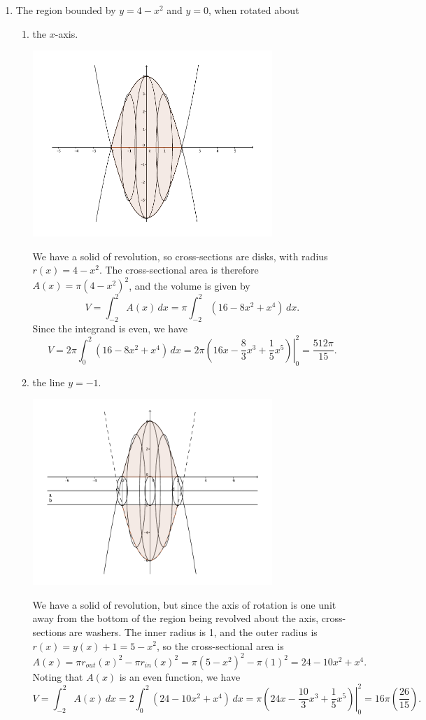 \documentclass[12pt]{article}
\begin{document}
\begin{enumerate}
\begin{enumerate}
 \item The region bounded by $y=4-x^2$ and $y=0$, when rotated about
\begin{enumerate}
 \item the $x$-axis.


 \includegraphics[width=0.75\textwidth]{WS4-2ci}


We have a solid of revolution, so cross-sections are disks, with radius $r(x)=4-x^2$. The cross-sectional area is therefore $A(x)=\pi(4-x^2)^2$, and the volume is given by
\[
 V = \int_{-2}^2A(x)\,dx = \pi\int_{-2}^2(16-8x^2+x^4)\,dx.
\]
Since the integrand is even, we have
\[
 V=2\pi\int_0^2(16-8x^2+x^4)\,dx = 2\pi\left.\left(16x-\frac{8}{3}x^3+\frac{1}{5}x^5\right)\right|_0^2 = \frac{512\pi}{15}.
\]
\newpage

 \item the line $y=-1$.


 \includegraphics[width=0.75\textwidth]{WS4-2cii}


We have a solid of revolution, but since the axis of rotation is one unit away from the bottom of the region being revolved about the axis, cross-sections are washers. The inner radius is 1, and the outer radius is $r(x)=y(x)+1=5-x^2$, so the cross-sectional area is
\[
 A(x) = \pi r_{out}(x)^2-\pi r_{in}(x)^2 = \pi(5-x^2)^2-\pi(1)^2 = 24-10x^2+x^4.
\]
Noting that $A(x)$ is an even function, we have
\[
 V = \int_{-2}^2A(x)\,dx = 2\int_0^2(24-10x^2+x^4)\,dx = \pi\left.\left(24x-\frac{10}{3}x^3+\frac{1}{5}x^5\right)\right|_0^2 = 16\pi\left(\frac{26}{15}\right).
\]
\newpage


\end{enumerate}
\end{enumerate}
\end{enumerate}
\end{document}
